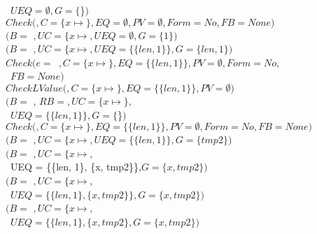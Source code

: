 \begin{small}
\begin{tabbing}
\>\>\>\>\>\>~$UEQ =  \emptyset, G = \{$\}$)$ \\
\>\>\>\>\>$Check($$,C  =\{x\mapsto$$\}, EQ = \emptyset, PV = \emptyset,
                       Form = No, FB = None)$\\
\>\>\>\>\>\>$(B = $ $, \mathit{UC} = \{x\mapsto$$,
                  UEQ = \emptyset, G = \{1\})$\\
\>\>\>\>\>$(B = $ $, \mathit{UC} = \{x\mapsto$$,
                  UEQ = \{\{len, 1\}\}, G = \{len, 1\})$\\
\>\>\>\>$Check(e=$~$, C=\{x \mapsto$$\},
          EQ=\{\{len, 1\}\},PV=\emptyset, Form = No,$\\
\>\>\>\>~$FB = None)$\\
\>\>\>\>\>$CheckLValue($$, C = \{x \mapsto$$\}, 
                                      EQ = \{\{len, 1\}\}, PV = \emptyset)$ \\
\>\>\>\>\>\>$(B = $ , $RB = $$,
                     \mathit{UC} = \{x \mapsto$$\},$\\
\>\>\>\>\>\>~$UEQ = \{\{len, 1\}\}, G = \{$\}$)$ \\
\>\>\>\>\>$Check($$,C  =\{x\mapsto$$\}, EQ = \{\{len, 1\}\}, PV = \emptyset,
                       Form = No, FB = None)$\\
\>\>\>\>\>\>$(B = $ $, \mathit{UC} = \{x\mapsto$$,
                      UEQ = \{\{len, 1\}\},G = \{tmp2\})$\\
\>\>\>\>\>$(B = $ $,
                   \mathit{UC} = \{x\mapsto$$,$\\
\>\>\>\>\>~UEQ = \{\{len, 1\}, \{x, tmp2\}\},$G = \{x, tmp2\})$\\
\>\>\>\>$(B = $ $, \mathit{UC} = \{x\mapsto$$,$\\
\>\>\>\>~$UEQ = \{\{len, 1\}, \{x, tmp2\}\}, G = \{x, tmp2\})$\\
\>\>\>$(B = $ $, \mathit{UC} = \{x\mapsto$$,$\\
\>\>\>~$UEQ = \{\{len, 1\}, \{x, tmp2\}, G = \{x, tmp2\})$\\ \\

\end{tabbing}
\end{small}
